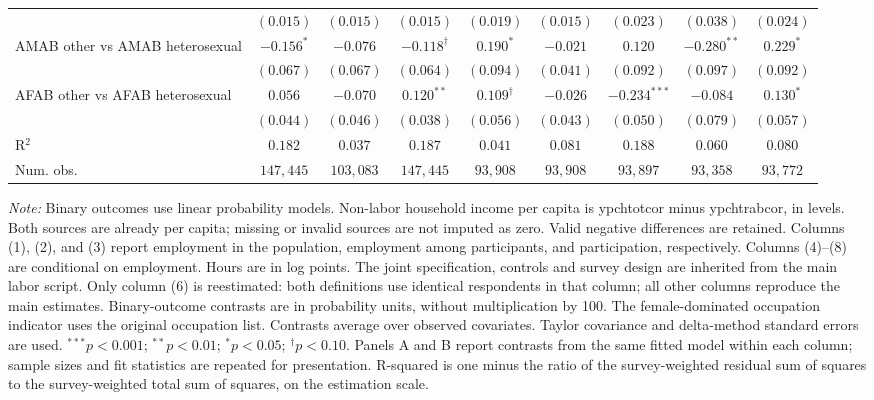 \begin{table}[htpb!]
{\begin{tabular}{l c c c c c c c c}
 & $(0.015)$ & $(0.015)$ & $(0.015)$ & $(0.019)$ & $(0.015)$ & $(0.023)$ & $(0.038)$ & $(0.024)$ \\
AMAB other vs AMAB heterosexual & $-0.156^{*}$ & $-0.076$ & $-0.118^{\dagger}$ & $0.190^{*}$ & $-0.021$ & $0.120$ & $-0.280^{**}$ & $0.229^{*}$ \\
 & $(0.067)$ & $(0.067)$ & $(0.064)$ & $(0.094)$ & $(0.041)$ & $(0.092)$ & $(0.097)$ & $(0.092)$ \\
AFAB other vs AFAB heterosexual & $0.056$ & $-0.070$ & $0.120^{**}$ & $0.109^{\dagger}$ & $-0.026$ & $-0.234^{***}$ & $-0.084$ & $0.130^{*}$ \\
 & $(0.044)$ & $(0.046)$ & $(0.038)$ & $(0.056)$ & $(0.043)$ & $(0.050)$ & $(0.079)$ & $(0.057)$ \\
\hline
R$^2$ & $0.182$ & $0.037$ & $0.187$ & $0.041$ & $0.081$ & $0.188$ & $0.060$ & $0.080$ \\
Num. obs. & $147,445$ & $103,083$ & $147,445$ & $93,908$ & $93,908$ & $93,897$ & $93,358$ & $93,772$ \\
\hline
\end{tabular}%
}
\par\vspace{1ex}
\begin{minipage}{\textwidth}\footnotesize\raggedright
\textit{Note:} Binary outcomes use linear probability models. Non-labor household income per capita is ypchtotcor minus ypchtrabcor, in levels. Both sources are already per capita; missing or invalid sources are not imputed as zero. Valid negative differences are retained. Columns (1), (2), and (3) report employment in the population, employment among participants, and participation, respectively. Columns (4)--(8) are conditional on employment. Hours are in log points. The joint specification, controls and survey design are inherited from the main labor script. Only column (6) is reestimated: both definitions use identical respondents in that column; all other columns reproduce the main estimates. Binary-outcome contrasts are in probability units, without multiplication by 100. The female-dominated occupation indicator uses the original occupation list. Contrasts average over observed covariates. Taylor covariance and delta-method standard errors are used. $^{***}p<0.001$; $^{**}p<0.01$; $^{*}p<0.05$; $^{\dagger}p<0.10$. Panels A and B report contrasts from the same fitted model within each column; sample sizes and fit statistics are repeated for presentation. R-squared is one minus the ratio of the survey-weighted residual sum of squares to the survey-weighted total sum of squares, on the estimation scale.
\end{minipage}
\end{table}
